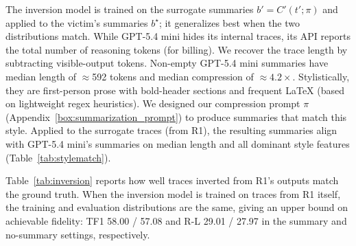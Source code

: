 \documentclass{article}
\newcommand\shortsection[1]{\vspace{.75ex}{\noindent\bf #1.}}
\begin{document}

\shortsection{Matching summaries (GPT-5.4 mini)}
The inversion model is trained on the surrogate summaries $b' = C'(t'; \pi)$ and applied to the victim's summaries $b^{\star}$; it generalizes best when the two distributions match.  While GPT-5.4 mini hides its internal traces, its API reports the total number of reasoning tokens (for billing). We recover the trace length by subtracting visible-output tokens. Non-empty GPT-5.4 mini summaries have median length of $\approx$592 tokens and median compression of $\approx$$4.2\times$. Stylistically, they are first-person prose with bold-header sections and frequent LaTeX (based on lightweight regex heuristics).  We designed our compression prompt $\pi$ (Appendix~\ref{box:summarization_prompt}) to produce summaries that match this style.  Applied to the surrogate traces (from R1), the resulting summaries align with GPT-5.4 mini's summaries on median length and all dominant style features (Table~\ref{tab:stylematch}).



\shortsection{Matching reasoning traces (R1)}
Table~\ref{tab:inversion} reports how well traces inverted from R1's outputs match the ground truth.  When the inversion model is trained on traces from R1 itself, the training and evaluation distributions are the same, giving an upper bound on achievable fidelity: TF1 58.00 / 57.08 and R-L 29.01 / 27.97 in the summary and no-summary settings, respectively.
\end{document}

